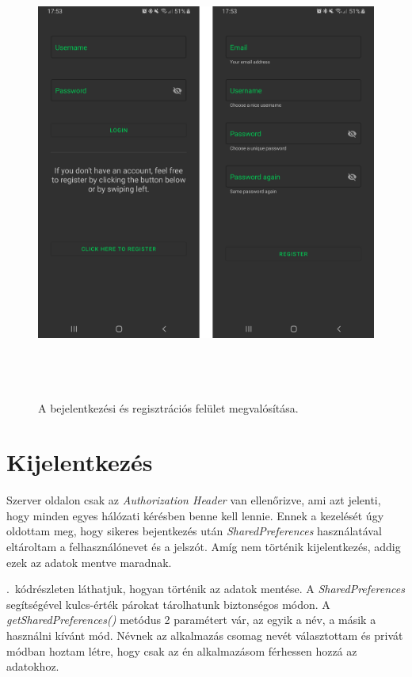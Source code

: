 \documentclass{thesis-ekf}
\theoremstyle{definition}
\theoremstyle{remark}
\begin{document}
\begin{figure}[!h]
	\centering
	\includegraphics[height=15cm]{pictures/android_login_registration}
	\caption{A bejelentkezési és regisztrációs felület megvalósítása.}
	\label{registration}
\end{figure}

\section{Kijelentkezés}

Szerver oldalon csak az \emph{Authorization Header} van ellenőrizve, ami azt jelenti, hogy minden egyes hálózati kérésben benne kell lennie.
Ennek a kezelését úgy oldottam meg, hogy sikeres bejentkezés után \emph{SharedPreferences} használatával eltároltam a felhasználónevet és a jelszót.
Amíg nem történik kijelentkezés, addig ezek az adatok mentve maradnak.

.~kódrészleten láthatjuk, hogyan történik az adatok mentése.
A \emph{SharedPreferences} segítségével kulcs-érték párokat tárolhatunk biztonségos módon.
A \emph{getSharedPreferences()} metódus 2 paramétert vár, az egyik a név, a másik a használni kívánt mód. 
Névnek az alkalmazás csomag nevét választottam és privát módban hoztam létre, hogy csak az én alkalmazásom férhessen hozzá az adatokhoz.
\end{document}
